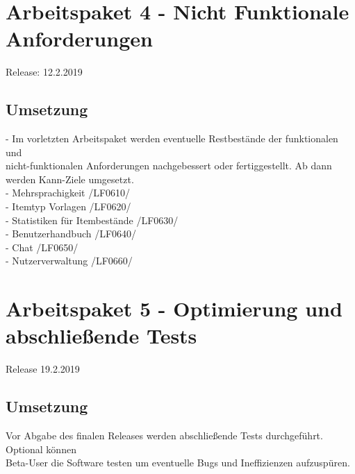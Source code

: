 \documentclass[11pt,a4paper]{report}
\begin{document}
\section{Arbeitspaket 4 - Nicht Funktionale Anforderungen }
Release: 12.2.2019 \\
\subsection{Umsetzung}
- Im vorletzten Arbeitspaket werden eventuelle Restbestände der funktionalen und\\ nicht-funktionalen Anforderungen nachgebessert oder fertiggestellt. Ab dann werden Kann-Ziele umgesetzt.\\
- Mehrsprachigkeit /LF0610/ \\
- Itemtyp Vorlagen /LF0620/ \\
- Statistiken für Itembestände /LF0630/ \\
- Benutzerhandbuch /LF0640/ \\
- Chat /LF0650/ \\
- Nutzerverwaltung /LF0660/ \\
\section{Arbeitspaket 5 - Optimierung und abschließende Tests}
Release 19.2.2019 \\
\subsection{Umsetzung}
Vor Abgabe des finalen Releases werden abschließende Tests durchgeführt. Optional können\\ Beta-User die Software testen um eventuelle Bugs und Ineffizienzen aufzuspüren. \\
\end{document}

